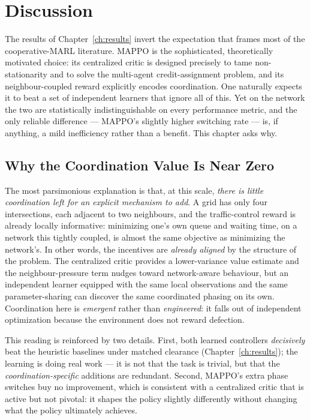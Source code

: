 \chapter{Discussion}
\label{ch:discussion}

The results of Chapter~\ref{ch:results} invert the expectation that frames most of
the cooperative-MARL literature. MAPPO is the sophisticated, theoretically motivated
choice: its centralized critic is designed precisely to tame non-stationarity and to
solve the multi-agent credit-assignment problem, and its neighbour-coupled reward
explicitly encodes coordination. One naturally expects it to beat a set of
independent learners that ignore all of this. Yet on the  network the two
are statistically indistinguishable on every performance metric, and the only
reliable difference --- MAPPO's slightly higher switching rate --- is, if anything, a
mild inefficiency rather than a benefit. This chapter asks why.

\section{Why the Coordination Value Is Near Zero}
The most parsimonious explanation is that, at this scale, \emph{there is little
coordination left for an explicit mechanism to add}. A  grid has only four
intersections, each adjacent to two neighbours, and the traffic-control reward is
already locally informative: minimizing one's own queue and waiting time, on a
network this tightly coupled, is almost the same objective as minimizing the
network's. In other words, the incentives are \emph{already aligned} by the
structure of the problem. The centralized critic provides a lower-variance value
estimate and the neighbour-pressure term nudges toward network-aware behaviour, but
an independent learner equipped with the same local observations and the same
parameter-sharing can discover the same coordinated phasing on its own. Coordination
here is \emph{emergent} rather than \emph{engineered}: it falls out of independent
optimization because the environment does not reward defection.

This reading is reinforced by two details. First, both learned controllers
\emph{decisively} beat the heuristic baselines under matched clearance
(Chapter~\ref{ch:results}); the learning is doing real work --- it is not that the
task is trivial, but that the \emph{coordination-specific} additions are redundant.
Second, MAPPO's extra phase switches buy no improvement, which is consistent with a
centralized critic that is active but not pivotal: it shapes the policy slightly
differently without changing what the policy ultimately achieves.

